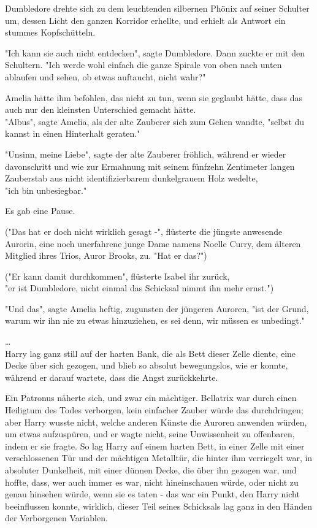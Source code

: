 {Dumbledore drehte sich zu dem leuchtenden silbernen Phönix auf seiner Schulter um, dessen Licht den ganzen Korridor erhellte, und erhielt als Antwort ein stummes Kopfschütteln.

"Ich kann sie auch nicht entdecken", sagte Dumbledore. Dann zuckte er mit den Schultern. "Ich werde wohl einfach die ganze Spirale von oben nach unten ablaufen und sehen, ob etwas auftaucht, nicht wahr?"

Amelia hätte ihm befohlen, das nicht zu tun, wenn sie geglaubt hätte, dass das auch nur den kleinsten Unterschied gemacht hätte.\\ "Albus", sagte Amelia, als der alte Zauberer sich zum Gehen wandte, "selbst du kannst in einen Hinterhalt geraten."

"Unsinn, meine Liebe", sagte der alte Zauberer fröhlich, während er wieder davonschritt und wie zur Ermahnung mit seinem fünfzehn Zentimeter langen Zauberstab aus nicht identifizierbarem dunkelgrauem Holz wedelte,\\ "ich bin unbesiegbar."

Es gab eine Pause.

("Das hat er doch nicht wirklich gesagt -", flüsterte die jüngste anwesende Aurorin, eine noch unerfahrene junge Dame namens Noelle Curry, dem älteren Mitglied ihres Trios, Auror Brooks, zu. "Hat er das?")

("Er kann damit durchkommen", flüsterte Isabel ihr zurück,\\ "er ist Dumbledore, nicht einmal das Schicksal nimmt ihn mehr ernst.")

"Und das", sagte Amelia heftig, zugunsten der jüngeren Auroren, "ist der Grund, warum wir ihn nie zu etwas hinzuziehen, es sei denn, wir müssen es unbedingt."

…\\ Harry lag ganz still auf der harten Bank, die als Bett dieser Zelle diente, eine Decke über sich gezogen, und blieb so absolut bewegungslos, wie er konnte, während er darauf wartete, dass die Angst zurückkehrte.

Ein Patronus näherte sich, und zwar ein mächtiger. Bellatrix war durch einen Heiligtum des Todes verborgen, kein einfacher Zauber würde das durchdringen; aber Harry wusste nicht, welche anderen Künste die Auroren anwenden würden, um etwas aufzuspüren, und er wagte nicht, seine Unwissenheit zu offenbaren, indem er sie fragte. So lag Harry auf einem harten Bett, in einer Zelle mit einer verschlossenen Tür und der mächtigen Metalltür, die hinter ihm verriegelt war, in absoluter Dunkelheit, mit einer dünnen Decke, die über ihn gezogen war, und hoffte, dass, wer auch immer es war, nicht hineinschauen würde, oder nicht zu genau hinsehen würde, wenn sie es taten - das war ein Punkt, den Harry nicht beeinflussen konnte, wirklich, dieser Teil seines Schicksals lag ganz in den Händen der Verborgenen Variablen.

}
